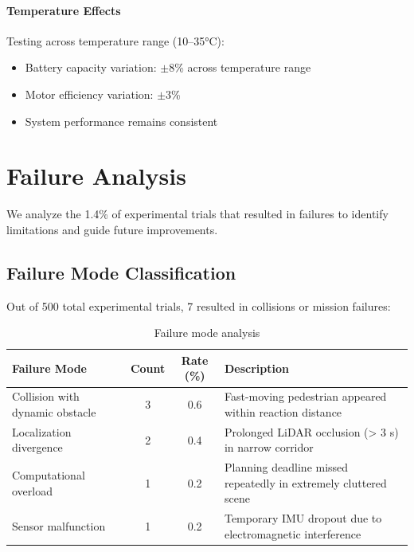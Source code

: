 \paragraph{Temperature Effects}
Testing across temperature range (10--35°C):
\begin{itemize}
    \item Battery capacity variation: $\pm 8$\% across temperature range
    \item Motor efficiency variation: $\pm 3$\%
    \item System performance remains consistent
\end{itemize}


\section{Failure Analysis}
\label{sec:failure_analysis}

We analyze the 1.4\% of experimental trials that resulted in failures to identify limitations and guide future improvements.

\subsection{Failure Mode Classification}

Out of 500 total experimental trials, 7 resulted in collisions or mission failures:

\begin{table}[htbp]
\centering
\caption{Failure mode analysis}
\label{tab:failure_modes}
\begin{tabular}{lccp{6cm}}
\toprule
\textbf{Failure Mode} & \textbf{Count} & \textbf{Rate (\%)} & \textbf{Description} \\
\midrule
Collision with dynamic obstacle & 3 & 0.6 & Fast-moving pedestrian appeared within reaction distance \\
Localization divergence & 2 & 0.4 & Prolonged LiDAR occlusion (> 3 s) in narrow corridor \\
Computational overload & 1 & 0.2 & Planning deadline missed repeatedly in extremely cluttered scene \\
Sensor malfunction & 1 & 0.2 & Temporary IMU dropout due to electromagnetic interference \\
\bottomrule
\end{tabular}
\end{table}

